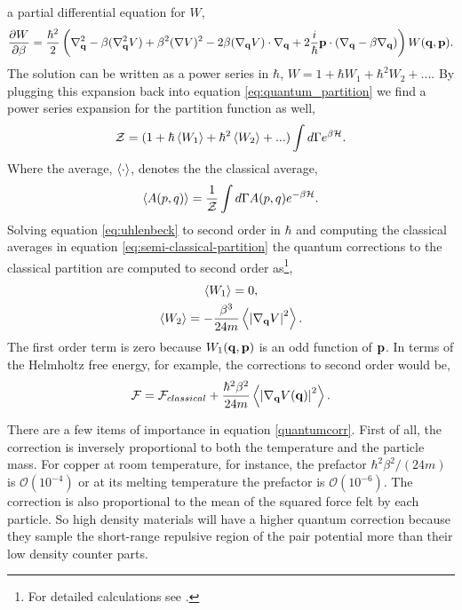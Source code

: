 a partial differential equation for $W$,
%
\begin{equation} 
    \label{eq:uhlenbeck} 
    \frac{\partial W}{\partial \beta} = \frac{\hbar^2}{2} \left(
        \nabla_{\mathbf{q}}^2 
        - \beta(\nabla_{\mathbf{q}}^2V)
        + \beta^2(\nabla V)^2 
        - 2\beta(\nabla_{\mathbf{q}} V)\cdot\nabla_{\mathbf{q}}
        + 2 \frac{i}{\hbar}\mathbf{p}\cdot(\nabla_{\mathbf{q}} -\beta\nabla_{\mathbf{q}}) 
    \right)W(\mathbf{q}, \mathbf{p}).
\end{equation}
%
The solution can be written as a power series in $\hbar$, $W = 1 + \hbar W_1 +
\hbar^2 W_2 + ...$. By plugging this expansion back into equation
\ref{eq:quantum_partition} we find a power series expansion for the partition
function as well,
%
\begin{equation}
    \label{eq:semi-classical-partition}
    \mathcal{Z} = (1 + \hbar \left\langle W_1 \right\rangle + \hbar^2 \left\langle W_2 \right\rangle+ ...)
        \int d\Gamma e^{\beta\mathcal{H}}.
\end{equation}
%
Where the average, $\left\langle \cdot \right\rangle$, denotes the the classical average, 
%
\begin{equation} \langle A(p, q) \rangle = \frac{1}{\mathcal{Z}} \int d\Gamma A(p, q)
e^{-\beta \mathcal{H}}.  \end{equation}
%
Solving equation \ref{eq:uhlenbeck} to second order in $\hbar$ and computing
the classical averages in equation \ref{eq:semi-classical-partition} the
quantum corrections to the classical partition are computed to second 
order as\footnote{For detailed calculations see \cite{LANDAU198079}.},
%
\begin{gather}
    \left\langle W_1 \right\rangle= 0, \\
    \left\langle W_2 \right\rangle = - \frac{\beta^3}{24 m} \left\langle \left\vert\nabla_{\mathbf{q}} V \right\vert^2 \right\rangle.
\end{gather}
%
The first order term is zero because $W_1(\mathbf{q}, \mathbf{p})$ is an odd function of $\mathbf{p}$.
In terms of the Helmholtz free energy, for example, the corrections to second
order would be, 
%
\begin{equation}
    \label{quantumcorr}
    \mathcal{F} = \mathcal{F}_{classical} + \frac{\hbar^2\beta^2}{24m}
        \left\langle  \left\vert \nabla_{\mathbf{q}} V(\mathbf{q}) \right\vert^2  \right\rangle.
\end{equation}

There are a few items of importance in equation \ref{quantumcorr}. First of
all, the correction is inversely proportional to both the temperature and the
particle mass.  For copper at room temperature, for instance, the prefactor
$\hbar^2\beta^2/(24 m)$ is $\mathcal{O}(10^{-4})$ or at its melting temperature
the prefactor is $\mathcal{O}(10^{-6})$.  The correction is also proportional
to the mean of the squared force felt by each particle. So high density
materials will have a higher quantum correction because they sample the
short-range repulsive region of the pair potential more than their low density
counter parts.

